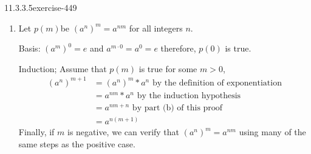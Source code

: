 \documentclass[twoside,10pt,]{book}
\numberwithin{equation}{section}
\begin{document}
\begin{divisionsolution}{11.3.3.5}{}{exercise-449}
\begin{enumerate}[label=(\alph*)]
\par
\hypertarget{p-3949}{}%
Induction: Assume that for some \(m > 1\), \(p(m)\) is true. Then%
\begin{equation*}
\begin{split}
a^{n+(m+1)}&= a^{(n+m)+1}\textrm{      by the associativity of integer addition}\\
&=a^{n+m}*a^1\textrm{    by the definition of exponentiation}\\
&=\left(a^n*a^m\right)*a^1 \textrm{     by the induction hypothesis}\\
&= a^n*\left(a^m*a^1\right)\textrm{     by associativity}\\
&= a^n*a^{m+1}\textrm{    by the definition of exponentiation}
\end{split}
\end{equation*}
To complete the proof, you need to consider the cases where \(m\) and\slash{}or \(n\) are negative.%
\item\hypertarget{li-1794}{}\hypertarget{p-3950}{}%
Let \(p(m)\)be \(\left(a^n\right)^m= a^{n m}\) for all integers \(n\).%
\par
\hypertarget{p-3951}{}%
Basis: \(\left(a^m\right)^0= e\) and \(a^{m\cdot 0}=a^0= e\) therefore, \(p(0)\) is true.%
\par
\hypertarget{p-3952}{}%
Induction; Assume that \(p(m)\) is true for some \(m >\)0,%
\begin{equation*}
\begin{split}
\left(a^n\right)^{m+1}&=\left(a^n\right)^m*a^n \textrm{     by the definition of exponentiation}\\
&=a^{n m}*a^n\textrm{      by the induction hypothesis}\\
& =a^{n m + n}\textrm{      by part (b)  of this proof}\\
& =a^{n(m+1)}
\end{split}
\end{equation*}
Finally, if \(m\) is negative, we can verify that \(\left(a^n\right)^m= a^{n m}\) using many of the same steps as the positive case.%
\end{enumerate}
%
\end{divisionsolution}%
\end{document}
